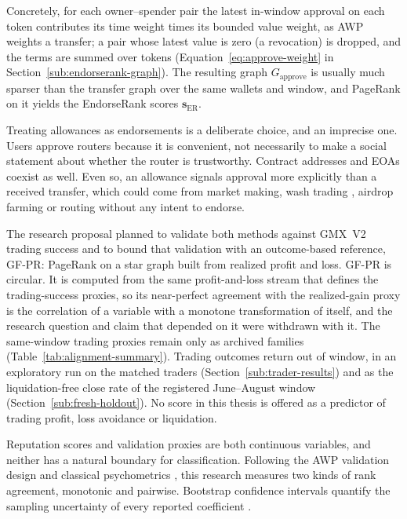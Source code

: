 Concretely, for each owner--spender pair the latest in-window approval on each token contributes its time weight times its bounded value weight, as AWP weights a transfer; a pair whose latest value is zero (a revocation) is dropped, and the terms are summed over tokens (Equation~\eqref{eq:approve-weight} in Section~\ref{sub:endorserank-graph}). The resulting graph $G_{\text{approve}}$ is usually much sparser than the transfer graph over the same wallets and window, and PageRank on it yields the EndorseRank scores $\mathbf{s}_{\mathrm{ER}}$.

Treating allowances as endorsements is a deliberate choice, and an imprecise one. Users approve routers because it is convenient, not necessarily to make a social statement about whether the router is trustworthy. Contract addresses and EOAs coexist as well. Even so, an allowance signals approval more explicitly than a received transfer, which could come from market making, wash trading , airdrop farming  or routing without any intent to endorse.


The research proposal planned to validate both methods against GMX~V2 trading success and to bound that validation with an outcome-based reference, GF-PR: PageRank on a star graph built from realized profit and loss. GF-PR is circular. It is computed from the same profit-and-loss stream that defines the trading-success proxies, so its near-perfect agreement with the realized-gain proxy is the correlation of a variable with a monotone transformation of itself, and the research question and claim that depended on it were withdrawn with it. The same-window trading proxies remain only as archived families (Table~\ref{tab:alignment-summary}). Trading outcomes return out of window, in an exploratory run on the matched traders (Section~\ref{sub:trader-results}) and as the liquidation-free close rate of the registered June--August window (Section~\ref{sub:fresh-holdout}). No score in this thesis is offered as a predictor of trading profit, loss avoidance or liquidation.


Reputation scores and validation proxies are both continuous variables, and neither has a natural boundary for classification. Following the AWP validation design and classical psychometrics , this research measures two kinds of rank agreement, monotonic and pairwise. Bootstrap confidence intervals quantify the sampling uncertainty of every reported coefficient .

